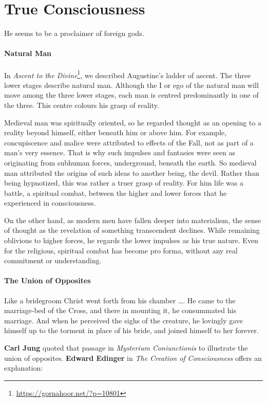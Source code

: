 \section{True Consciousness}

\begin{quotex}
He seems to be a proclaimer of foreign gods. 

\end{quotex}
\paragraph{Natural Man}
In \textit{Ascent to the Divine}\footnote{\url{https://gornahoor.net/?p=10801}}, we described Augustine's ladder of ascent. The three lower stages describe natural man. Although the I or ego of the natural man will move among the three lower stages, each man is centred predominantly in one of the three. This centre colours his grasp of reality.

Medieval man was spiritually oriented, so he regarded thought as an opening to a reality beyond himself, either beneath him or above him. For example, concupiscence and malice were attributed to effects of the Fall, not as part of a man's very essence. That is why such impulses and fantasies were seen as originating from subhuman forces, underground, beneath the earth. So medieval man attributed the origins of such ideas to another being, the devil. Rather than being hypnotized, this was rather a truer grasp of reality. For him life was a battle, a spiritual combat, between the higher and lower forces that he experienced in consciousness.

On the other hand, as modern men have fallen deeper into materialism, the sense of thought as the revelation of something transcendent declines. While remaining oblivious to higher forces, he regards the lower impulses as his true nature. Even for the religious, spiritual combat has become pro forma, without any real commitment or understanding.

\paragraph{The Union of Opposites}
\begin{quotex}
Like a bridegroom Christ went forth from his chamber …. He came to the marriage-bed of the Cross, and there in mounting it, he consummated his marriage. And when he perceived the sighs of the creature, he lovingly gave himself up to the torment in place of his bride, and joined himself to her forever. 

\end{quotex}
\textbf{Carl Jung} quoted that passage in \emph{Mysterium Coniunctionis} to illustrate the union of opposites. \textbf{Edward Edinger} in \emph{The Creation of Consciousness} offers an explanation:


